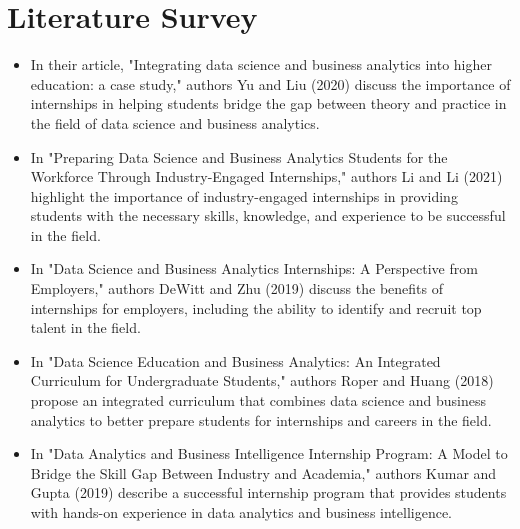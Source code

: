 \chapter{Literature Survey}
\justify
\quad
\begin{itemize}
\item In their article, "Integrating data science and business analytics into higher education: a case study," authors Yu and Liu (2020) discuss the importance of internships in helping students bridge the gap between theory and practice in the field of data science and business analytics.
\item In "Preparing Data Science and Business Analytics Students for the Workforce Through Industry-Engaged Internships," authors Li and Li (2021) highlight the importance of industry-engaged internships in providing students with the necessary skills, knowledge, and experience to be successful in the field.
\item In "Data Science and Business Analytics Internships: A Perspective from Employers," authors DeWitt and Zhu (2019) discuss the benefits of internships for employers, including the ability to identify and recruit top talent in the field.
\item In "Data Science Education and Business Analytics: An Integrated Curriculum for Undergraduate Students," authors Roper and Huang (2018) propose an integrated curriculum that combines data science and business analytics to better prepare students for internships and careers in the field.
\item In "Data Analytics and Business Intelligence Internship Program: A Model to Bridge the Skill Gap Between Industry and Academia," authors Kumar and Gupta (2019) describe a successful internship program that provides students with hands-on experience in data analytics and business intelligence.

\end{itemize}

\newpage